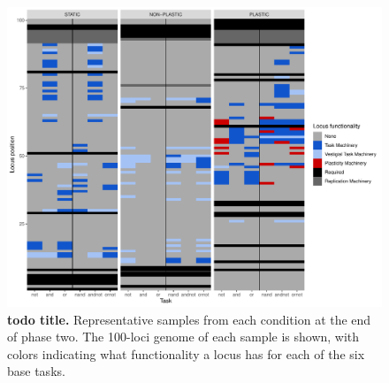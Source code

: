 \begin{figure}[h!]
    \centering
    \includegraphics[width=1\textwidth]{media/architecture/locus_slice_combined.pdf}
    \caption{\small
    \textbf{todo title.}
    Representative samples from each condition at the end of phase two. 
    The 100-loci genome of each sample is shown, with colors indicating what functionality a locus has for each of the six base tasks. 
    }
    \label{fig:architecture_locus_functionality}
\end{figure}